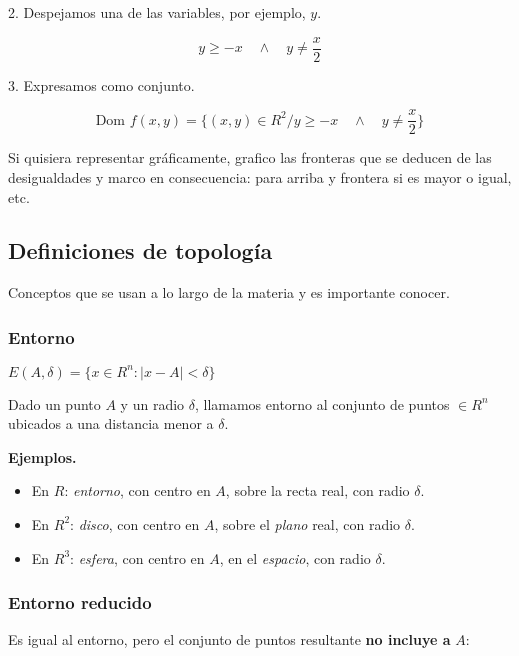 2. Despejamos una de las variables, por ejemplo, \(y\).

\begin{equation*}
    y \geq -x \quad \land \quad y \neq \frac{x}{2}
\end{equation*}

3. Expresamos como conjunto.

\begin{equation*}
    \text{Dom } f(x,y) = \{(x,y) \in R^{2} / y \geq -x \quad \land \quad y \neq \frac{x}{2}\}
\end{equation*}

Si quisiera representar gráficamente, grafico las fronteras que se deducen de 
las desigualdades y marco en consecuencia: para arriba y frontera si es mayor o 
igual, etc.

\subsection{Definiciones de topología}

Conceptos que se usan a lo largo de la materia y es importante conocer.

\subsubsection{Entorno}

\(E(A,\delta) = \{x \in R^{n}: |x-A| < \delta\}\)

Dado un punto \(A\) y un radio \(\delta\), llamamos entorno al conjunto de 
puntos \(\in R^{n}\) ubicados a una distancia menor a \(\delta\). 

\textbf{Ejemplos.}

\begin{itemize}
    \item En \(R\): \textit{entorno}, con centro en \(A\), sobre la recta real, 
    con radio \(\delta\).
    \item En \(R^{2}\): \textit{disco}, con centro en \(A\), sobre el 
    \textit{plano} real, con radio \(\delta\).
    \item En \(R^{3}\): \textit{esfera}, con centro en \(A\), en el 
    \textit{espacio}, con radio \(\delta\).
\end{itemize}


\subsubsection{Entorno reducido}

Es igual al entorno,
pero el conjunto de puntos resultante \textbf{no incluye a} \(A\):

